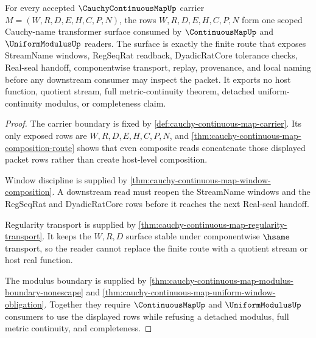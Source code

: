 \begin{theorem}
\label{thm:cauchy-continuous-map-scoped-surface}
For every accepted $\CauchyContinuousMapUp$ carrier $M=(W,R,D,E,H,C,P,N)$, the rows $W,R,D,E,H,C,P,N$ form one scoped Cauchy-name transformer surface consumed by $\ContinuousMapUp$ and $\UniformModulusUp$ readers. The surface is exactly the finite route that exposes StreamName windows, RegSeqRat readback, DyadicRatCore tolerance checks, Real-seal handoff, componentwise transport, replay, provenance, and local naming before any downstream consumer may inspect the packet. It exports no host function, quotient stream, full metric-continuity theorem, detached uniform-continuity modulus, or completeness claim.
\end{theorem}
\begin{proof}
The carrier boundary is fixed by \autoref{def:cauchy-continuous-map-carrier}. Its only exposed rows are $W,R,D,E,H,C,P,N$, and \autoref{thm:cauchy-continuous-map-composition-route} shows that even composite reads concatenate those displayed packet rows rather than create host-level composition.

Window discipline is supplied by \autoref{thm:cauchy-continuous-map-window-composition}. A downstream read must reopen the StreamName windows and the RegSeqRat and DyadicRatCore rows before it reaches the next Real-seal handoff.

Regularity transport is supplied by \autoref{thm:cauchy-continuous-map-regularity-transport}. It keeps the $W,R,D$ surface stable under componentwise $\hsame$ transport, so the reader cannot replace the finite route with a quotient stream or host real function.

The modulus boundary is supplied by \autoref{thm:cauchy-continuous-map-modulus-boundary-nonescape} and \autoref{thm:cauchy-continuous-map-uniform-window-obligation}. Together they require $\ContinuousMapUp$ and $\UniformModulusUp$ consumers to use the displayed rows while refusing a detached modulus, full metric continuity, and completeness.
\end{proof}




